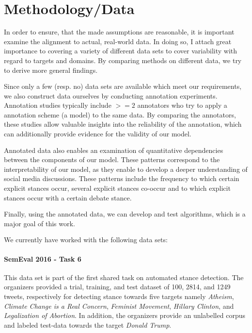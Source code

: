 \documentclass[11pt]{article}
\begin{document}
\section{Methodology/Data}

In order to ensure, that the made assumptions are reasonable, it is important examine the alignment to actual, real-world data.
In doing so, I attach great importance to covering a variety of different data sets to cover variability with regard to targets and domains.
By comparing methods on different data, we try to derive more general findings.

Since only a few (resp. no) data sets are available which meet our requirements, we also construct data ourselves by conducting annotation experiments.
Annotation studies typically include $>=2$ annotators who try to apply a annotation scheme (a model) to the same data.
By comparing the annotators, these studies allow valuable insights into the reliability of the annotation, which can additionally provide evidence for the validity of our model.

Annotated data also enables an examination of quantitative dependencies between the components of our model.
These patterns correspond to the interpretability of our model, as they enable to develop a deeper understanding of social media discussions.
These patterns include the frequency to which certain explicit stances occur, several explicit stances co-occur and to which explicit stances occur with a certain debate stance.

Finally, using the annotated data, we can develop and test algorithms, which is a major goal of this work.

We currently have worked with the following data sets:
\paragraph{SemEval 2016 - Task 6 \cite{mohammad2016stance}}

This data set is part of the first shared task on automated stance detection.
The organizers provided a trial, training, and test dataset of 100, 2814, and 1249 tweets, respectively for detecting stance towards five targets namely
\textit{Atheism}, \textit{Climate Change is a Real Concern}, \textit{Feminist Movement}, \textit{Hillary Clinton}, and \textit{Legalization of Abortion}.
In addition, the organizers provide an unlabelled corpus and labeled test-data towards the target \textit{Donald Trump}.
\end{document}
